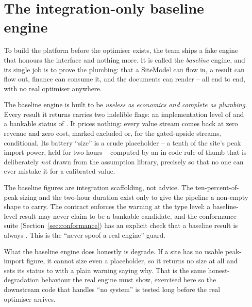 \section{The integration-only baseline engine}

To build the platform before the optimiser exists, the team ships a fake engine that honours the interface and nothing more. It is called the \emph{baseline} engine, and its single job is to prove the plumbing: that a SiteModel can flow in, a result can flow out, finance can consume it, and the documents can render -- all end to end, with no real optimiser anywhere.

The baseline engine is built to be \emph{useless as economics and complete as plumbing}. Every result it returns carries two indelible flags: an implementation level of  and a bankable status of . It prices nothing: every value stream comes back at zero revenue and zero cost, marked excluded or, for the gated-upside streams, conditional. Its battery ``size'' is a crude placeholder -- a tenth of the site's peak import power, held for two hours -- computed by an in-code rule of thumb that is deliberately \emph{not} drawn from the assumption library, precisely so that no one can ever mistake it for a calibrated value.

\begin{caution}
The baseline figures are integration scaffolding, not advice. The ten-percent-of-peak sizing and the two-hour duration exist only to give the pipeline a non-empty shape to carry. The contract enforces the warning at the type level: a baseline-level result may never claim to be a bankable candidate, and the conformance suite (Section~\ref{sec:conformance}) has an explicit check that a baseline result is always . This is the ``never spoof a real engine'' guard.
\end{caution}

What the baseline engine does honestly is degrade. If a site has no usable peak-import figure, it cannot size even a placeholder, so it returns no size at all and sets its status to  with a plain warning saying why. That is the same honest-degradation behaviour the real engine must show, exercised here so the downstream code that handles ``no system'' is tested long before the real optimiser arrives.

